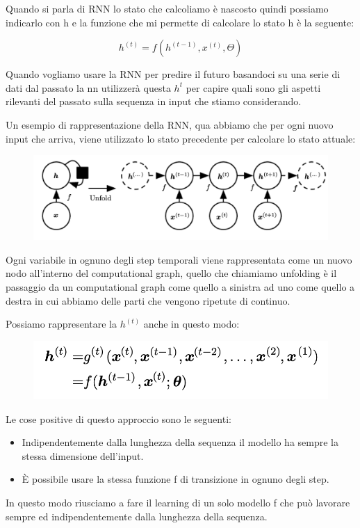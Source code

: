 \documentclass[14pt]{extreport}
\begin{document}
Quando si parla di RNN lo stato che calcoliamo è nascosto quindi possiamo indicarlo con h e la funzione che mi permette di calcolare lo stato h è la seguente:

$$h^{(t)} = f(h^{(t-1)}, x^{(t)}, \Theta)$$

Quando vogliamo usare la RNN per predire il futuro basandoci su una serie di dati dal passato la nn utilizzerà questa $h^{t}$ per capire quali sono gli aspetti rilevanti del passato sulla sequenza in input che stiamo considerando.

Un esempio di rappresentazione della RNN, qua abbiamo che per ogni nuovo input che arriva, viene utilizzato lo stato precedente per calcolare lo stato attuale:
\begin{figure}[H]
\centering
\includegraphics[width=0.7\linewidth]{415.jpeg}
\end{figure}

Ogni variabile in ognuno degli step temporali viene rappresentata come un nuovo nodo all'interno del computational graph, quello che chiamiamo unfolding è il passaggio da un 
computational graph come quello a sinistra ad uno come quello a destra in cui abbiamo delle parti che vengono ripetute di continuo.

Possiamo rappresentare la $h^{(t)}$ anche in questo modo:
\begin{figure}[H]
	\centering
	\includegraphics[width=0.7\linewidth]{416.jpeg}
	\end{figure}

Le cose positive di questo approccio sono le seguenti:
\begin{itemize}
	\item Indipendentemente dalla lunghezza della sequenza il modello ha sempre la stessa dimensione dell'input.
	\item È possibile usare la stessa funzione f di transizione in ognuno degli step.
	\end{itemize} 

In questo modo riusciamo a fare il learning di un solo modello f che può lavorare sempre ed indipendentemente dalla lunghezza della sequenza.
\end{document}
